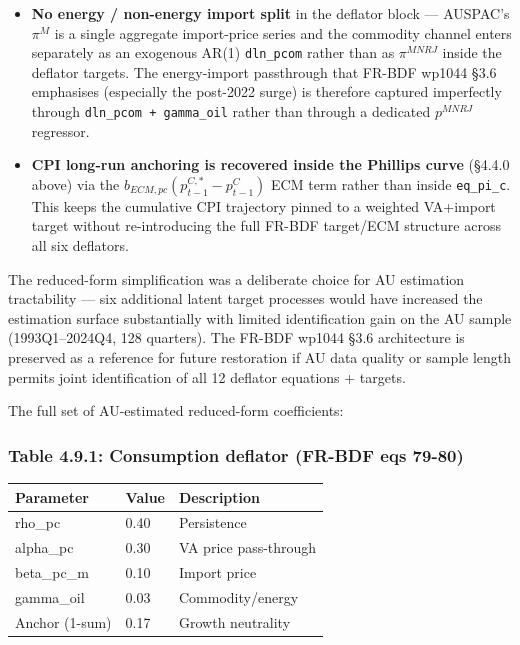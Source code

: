 \documentclass[
]{article}
\newcounter{none} %
\providecommand{\tightlist}{%
  \setlength{\itemsep}{0pt}\setlength{\parskip}{0pt}}
\begin{document}
\begin{itemize}
\tightlist
\item
  \textbf{No energy / non-energy import split} in the deflator block ---
  AUSPAC's \(\pi^M\) is a single aggregate import-price series and the
  commodity channel enters separately as an exogenous AR(1)
  \texttt{dln\_pcom} rather than as \(\pi^{MNRJ}\) inside the deflator
  targets. The energy-import passthrough that FR-BDF wp1044 §3.6
  emphasises (especially the post-2022 surge) is therefore captured
  imperfectly through \texttt{dln\_pcom\ +\ gamma\_oil} rather than
  through a dedicated \(p^{MNRJ}\) regressor.
\item
  \textbf{CPI long-run anchoring is recovered inside the Phillips curve}
  (§4.4.0 above) via the \(b_{ECM,pc}(p^{C,\ast}_{t-1} - p^C_{t-1})\)
  ECM term rather than inside \texttt{eq\_pi\_c}. This keeps the
  cumulative CPI trajectory pinned to a weighted VA+import target
  without re-introducing the full FR-BDF target/ECM structure across all
  six deflators.
\end{itemize}

The reduced-form simplification was a deliberate choice for AU
estimation tractability --- six additional latent target processes would
have increased the estimation surface substantially with limited
identification gain on the AU sample (1993Q1--2024Q4, 128 quarters). The
FR-BDF wp1044 §3.6 architecture is preserved as a reference for future
restoration if AU data quality or sample length permits joint
identification of all 12 deflator equations + targets.

The full set of AU-estimated reduced-form coefficients:

\subsubsection{Table 4.9.1: Consumption deflator (FR-BDF eqs
79-80)}\label{table-4.9.1-consumption-deflator-fr-bdf-eqs-79-80}

{\def\LTcaptype{none} %
\begin{longtable}[]{@{}lll@{}}
\toprule\noalign{}
Parameter & Value & Description \\
\midrule\noalign{}
\endhead
\bottomrule\noalign{}
\endlastfoot
rho\_pc & 0.40 & Persistence \\
alpha\_pc & 0.30 & VA price pass-through \\
beta\_pc\_m & 0.10 & Import price \\
gamma\_oil & 0.03 & Commodity/energy \\
Anchor (1-sum) & 0.17 & Growth neutrality \\
\end{longtable}
}
\end{document}
